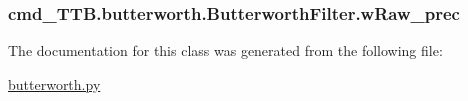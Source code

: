\subsubsection[{\texorpdfstring{w\+Raw\+\_\+prec}{wRaw_prec}}]{\setlength{\rightskip}{0pt plus 5cm}cmd\+\_\+\+T\+T\+B.\+butterworth.\+Butterworth\+Filter.\+w\+Raw\+\_\+prec}\hypertarget{classcmd__TTB_1_1butterworth_1_1ButterworthFilter_a112d92005652f64e47664227b5cf3c73}{}\label{classcmd__TTB_1_1butterworth_1_1ButterworthFilter_a112d92005652f64e47664227b5cf3c73}


The documentation for this class was generated from the following file\+:\begin{DoxyCompactItemize}
\item 
\hyperlink{butterworth_8py}{butterworth.\+py}\end{DoxyCompactItemize}
